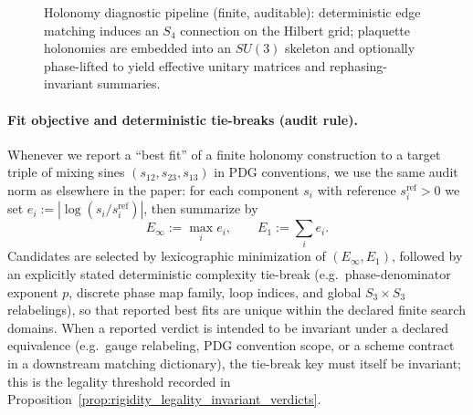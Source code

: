 \begin{figure}[t]
\centering
{}
\caption{Holonomy diagnostic pipeline (finite, auditable): deterministic edge matching induces an $S_4$ connection on the Hilbert grid; plaquette holonomies are embedded into an $SU(3)$ skeleton and optionally phase-lifted to yield effective unitary matrices and rephasing-invariant summaries.}
\label{fig:holonomy_pipeline}
\end{figure}

\paragraph{Fit objective and deterministic tie-breaks (audit rule).}
Whenever we report a ``best fit'' of a finite holonomy construction to a target triple of mixing sines $(s_{12},s_{23},s_{13})$ in PDG conventions, we use the same audit norm as elsewhere in the paper:
for each component $s_i$ with reference $s_i^{\mathrm{ref}}>0$ we set $e_i:=|\log(s_i/s_i^{\mathrm{ref}})|$, then summarize by
\[
E_\infty:=\max_i e_i,\qquad E_1:=\sum_i e_i.
\]
Candidates are selected by lexicographic minimization of $(E_\infty,E_1)$, followed by an explicitly stated deterministic complexity tie-break (e.g.\ phase-denominator exponent $p$, discrete phase map family, loop indices, and global $S_3\times S_3$ relabelings), so that reported best fits are unique within the declared finite search domains.
\AuditTag When a reported verdict is intended to be invariant under a declared equivalence (e.g.\ gauge relabeling, PDG convention scope, or a scheme contract in a downstream matching dictionary), the tie-break key must itself be invariant; this is the legality threshold recorded in Proposition~\ref{prop:rigidity_legality_invariant_verdicts}.

